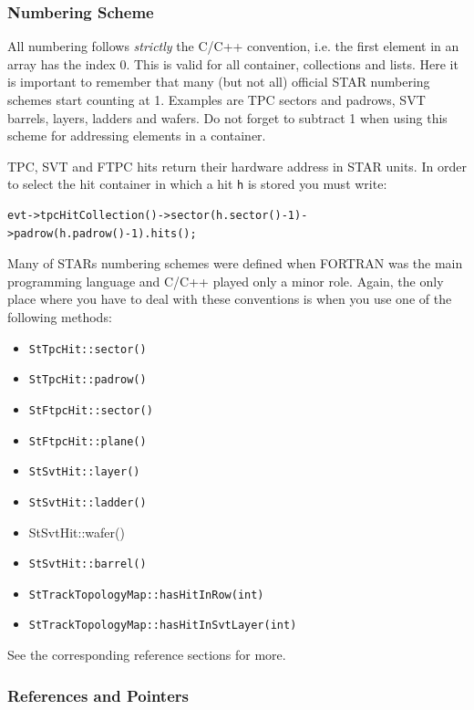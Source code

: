 \documentclass[twoside]{article}
\begin{document}
\subsubsection{Numbering Scheme}
\label{sec:conventionsNumbering}

All numbering follows \emph{strictly} the C/C++ convention, i.e. the
first element in an array has the index 0. This is valid for all
container, collections and lists. Here it is important to remember
that many (but not all) official STAR numbering schemes start counting
at 1.  Examples are TPC sectors and padrows, SVT barrels, layers, ladders and
wafers. Do not forget to subtract 1 when using this scheme for
addressing elements in a container.

TPC, SVT and FTPC hits return their hardware address in STAR units.
In order to select the hit container in which a hit \texttt{h} is
stored you must write:
\begin{verbatim}
evt->tpcHitCollection()->sector(h.sector()-1)->padrow(h.padrow()-1).hits();
\end{verbatim}

Many of STARs numbering schemes were defined when FORTRAN was the main
programming language and C/C++ played only a minor role. Again, the only
place where you have to deal with these conventions is when you use one of the
following methods:
\begin{itemize}
\item \texttt{StTpcHit::sector()}
\item \texttt{StTpcHit::padrow()}
\item \texttt{StFtpcHit::sector()}
\item \texttt{StFtpcHit::plane()}
\item \texttt{StSvtHit::layer()}
\item \texttt{StSvtHit::ladder()}
\item \textrm{StSvtHit::wafer(})
\item \texttt{StSvtHit::barrel()}
\item \texttt{StTrackTopologyMap::hasHitInRow(int)}
\item \texttt{StTrackTopologyMap::hasHitInSvtLayer(int)}
\end{itemize}
See the corresponding reference sections for more.

\subsubsection{References and Pointers}
 
\end{document}

